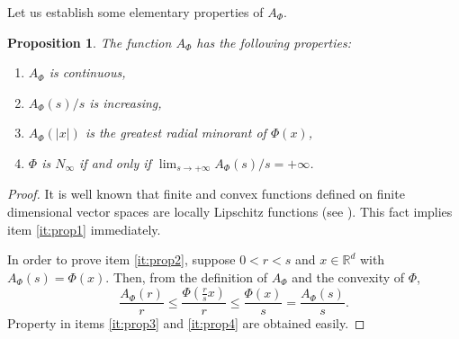 \documentclass[twoside]{article}
\newtheorem{prop}[thm]{Proposition}
\theoremstyle{remark}
\newcommand{\rr}{\mathbb{R}}
\renewcommand{\leq}{\leqslant}
\begin{document}
Let us establish some elementary properties of $A_{\Phi}$.
\begin{prop}\label{prop:AsubPhi} The function $A_{\Phi}$ has the following properties:
\begin{enumerate}
 \item\label{it:prop1} $A_{\Phi}$ is continuous,
 \item\label{it:prop2} $A_{\Phi}(s)/s$ is increasing,
 \item\label{it:prop3} $A_{\Phi}(|x|)$ is the \emph{greatest radial minorant} of 
 $\Phi(x)$,
 \item\label{it:prop4} $\Phi$ is $N_{\infty}$ if and only if $\lim_{s\to+\infty} A_{\Phi}(s)/s=+\infty$.
\end{enumerate}
\end{prop}

\begin{proof} It is well known that finite and convex functions defined on finite dimensional 
vector spaces are locally Lipschitz functions (see \cite{clarke2013functional}). This fact 
implies item \ref{it:prop1} immediately. 

In order to prove item \ref{it:prop2}, suppose $0<r<s$ and $x\in\rr^d$ with $A_{\Phi}(s)
=\Phi(x)$. Then, from the definition of $A_{\Phi}$ and the convexity of $\Phi$,
\[\frac{A_{\Phi}(r)}{r}\leq \frac{\Phi\left(\frac{r}{s}x\right)}{r}\leq \frac{\Phi\left(x\right)}{s}=
 \frac{A_{\Phi}(s)}{s}.
\]
Property in items \ref{it:prop3} and \ref{it:prop4} are obtained easily.

 
\end{proof}
\end{document}
